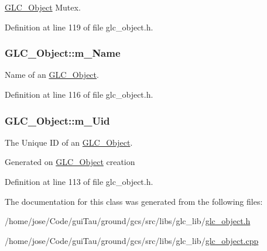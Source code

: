 \hyperlink{class_g_l_c___object}{G\-L\-C\-\_\-\-Object} Mutex. 



Definition at line 119 of file glc\-\_\-object.\-h.

\hypertarget{class_g_l_c___object_a33dc5c2f59f90204cf611a202501f26b}{
\subsubsection[{m\-\_\-\-Name}]{ G\-L\-C\-\_\-\-Object\-::m\-\_\-\-Name\hspace{0.3cm}{\ttfamily [protected]}}}\label{class_g_l_c___object_a33dc5c2f59f90204cf611a202501f26b}


Name of an \hyperlink{class_g_l_c___object}{G\-L\-C\-\_\-\-Object}. 



Definition at line 116 of file glc\-\_\-object.\-h.

\hypertarget{class_g_l_c___object_a6e7849a0927cfba751cebcb3f6c469a8}{
\subsubsection[{m\-\_\-\-Uid}]{ G\-L\-C\-\_\-\-Object\-::m\-\_\-\-Uid\hspace{0.3cm}{\ttfamily [protected]}}}\label{class_g_l_c___object_a6e7849a0927cfba751cebcb3f6c469a8}


The Unique I\-D of an \hyperlink{class_g_l_c___object}{G\-L\-C\-\_\-\-Object}. 

Generated on \hyperlink{class_g_l_c___object}{G\-L\-C\-\_\-\-Object} creation 

Definition at line 113 of file glc\-\_\-object.\-h.



The documentation for this class was generated from the following files\-:\begin{DoxyCompactItemize}
\item 
/home/jose/\-Code/gui\-Tau/ground/gcs/src/libs/glc\-\_\-lib/\hyperlink{glc__object_8h}{glc\-\_\-object.\-h}\item 
/home/jose/\-Code/gui\-Tau/ground/gcs/src/libs/glc\-\_\-lib/\hyperlink{glc__object_8cpp}{glc\-\_\-object.\-cpp}\end{DoxyCompactItemize}
